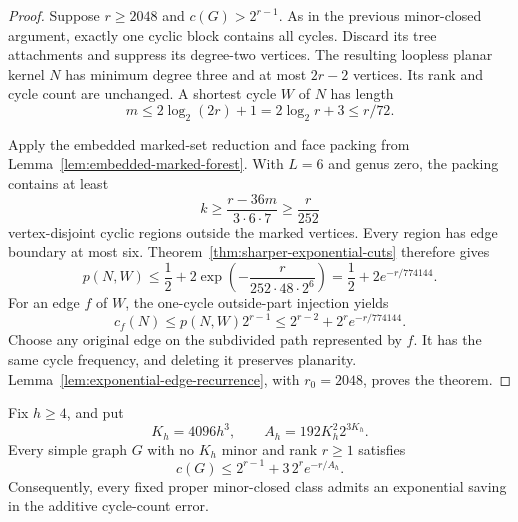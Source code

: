 \begin{proof}
Suppose $r\ge2048$ and $c(G)>2^{r-1}$.
As in the previous minor-closed argument, exactly one cyclic block contains all cycles.
Discard its tree attachments and suppress its degree-two vertices.
The resulting loopless planar kernel $N$ has minimum degree three and at most $2r-2$ vertices.
Its rank and cycle count are unchanged.
A shortest cycle $W$ of $N$ has length
\[
 m\le2\log_2(2r)+1=2\log_2r+3\le r/72.
\]

Apply the embedded marked-set reduction and face packing from Lemma~\ref{lem:embedded-marked-forest}.
With $L=6$ and genus zero, the packing contains at least
\[
 k\ge\frac{r-36m}{3\cdot6\cdot7}\ge\frac r{252}
\]
vertex-disjoint cyclic regions outside the marked vertices.
Every region has edge boundary at most six.
Theorem~\ref{thm:sharper-exponential-cuts} therefore gives
\[
 p(N,W)\le\frac12+
 2\exp\!\left(-\frac{r}{252\cdot48\cdot2^6}\right)
 =\frac12+2e^{-r/774144}.
\]
For an edge $f$ of $W$, the one-cycle outside-part injection yields
\[
 c_f(N)\le p(N,W)2^{r-1}
 \le2^{r-2}+2^r e^{-r/774144}.
\]
Choose any original edge on the subdivided path represented by $f$.
It has the same cycle frequency, and deleting it preserves planarity.
Lemma~\ref{lem:exponential-edge-recurrence}, with $r_0=2048$, proves the theorem.
\end{proof}

\begin{theorem}
\label{thm:minor-exponential-error}
Fix $h\ge4$, and put
\[
 K_h=4096h^3,\qquad A_h=192K_h^2 2^{3K_h}.
\]
Every simple graph $G$ with no $K_h$ minor and rank $r\ge1$ satisfies
\[
 c(G)\le2^{r-1}+3\,2^r e^{-r/A_h}.
\]
Consequently, every fixed proper minor-closed class admits an exponential saving in the additive cycle-count error.
\end{theorem}

